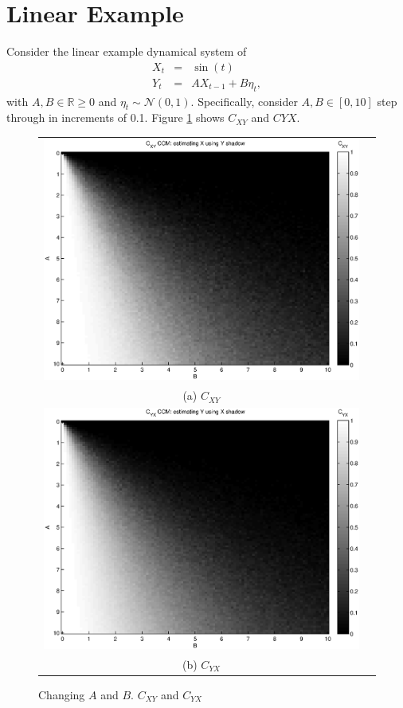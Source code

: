 \documentclass{article}
\begin{document}

\noindent\makebox[\linewidth]{\rule{\paperwidth}{0.4pt}}
\section{Linear Example}
Consider the linear example dynamical system of
\begin{eqnarray}
X_t &=& \sin(t)\\
Y_t &=& AX_{t-1}+B\eta_t,
\end{eqnarray}
with $A,B\in\mathbb{R}\ge 0$ and $\eta_t\sim\mathcal{N}\left(0,1\right)$.  Specifically, consider $A,B\in[0,10]$ step through in increments of 0.1.  Figure \ref{fig1} shows $C_{XY}$ and $C{YX}$.  
\begin{center}
\begin{figure}[H]
\begin{tabular}{cc}
\includegraphics[scale=0.5]{LinearEx_CXY.eps} \\
(a) $C_{XY}$ \\[6pt]
\includegraphics[scale=0.5]{LinearEx_CYX.eps} \\
(b) $C_{YX}$ \\[6pt]
\end{tabular}
\caption{Changing $A$ and $B$.  $C_{XY}$ and $C_{YX}$}
\label{fig1}
\end{figure}
\end{center}
\end{document}
